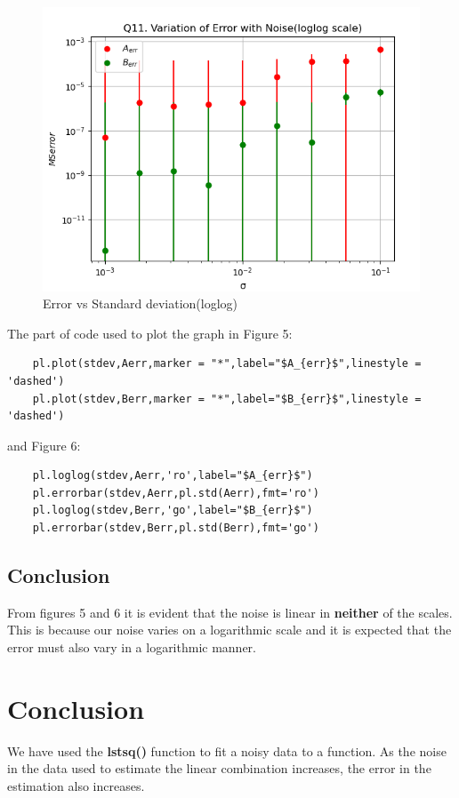 \documentclass[11pt, a4paper]{article}
\begin{document}
\begin{figure}[!h]
   	\centering
   	\includegraphics[scale=0.6]{Err with noise(loglog).png}   
   	\caption{Error vs Standard deviation(loglog)}
   	\label{fig:Figure 6}
\end{figure} 
The part of code used to plot the graph in Figure 5:
\begin{verbatim}
    pl.plot(stdev,Aerr,marker = "*",label="$A_{err}$",linestyle = 'dashed')
    pl.plot(stdev,Berr,marker = "*",label="$B_{err}$",linestyle = 'dashed')
\end{verbatim}
and Figure 6:
\begin{verbatim}
    pl.loglog(stdev,Aerr,'ro',label="$A_{err}$")
    pl.errorbar(stdev,Aerr,pl.std(Aerr),fmt='ro')
    pl.loglog(stdev,Berr,'go',label="$B_{err}$")
    pl.errorbar(stdev,Berr,pl.std(Berr),fmt='go')
\end{verbatim}

\subsection{Conclusion}
From figures 5 and 6 it is evident that the noise is linear in \textbf{neither} of the scales. This is because our noise varies on a logarithmic
scale and it is expected that the error must also vary in a logarithmic manner.

\section{Conclusion}
We have used the \textbf{lstsq()} function to fit a noisy data to a function. As the noise in the data used
to estimate the linear combination increases, the error in the estimation also
increases.
 
\end{document}
